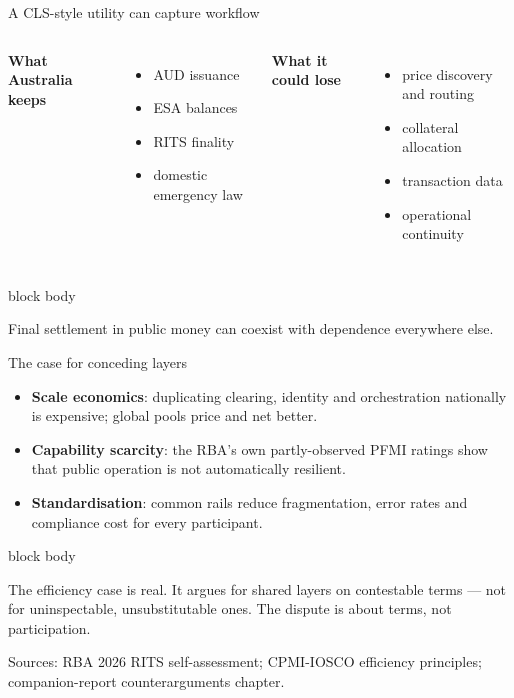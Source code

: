 \documentclass[aspectratio=169,12pt]{beamer}
\newcommand{\rust}[1]{\textcolor{Rust}{\textbf{#1}}}
\newcommand{\blue}[1]{\textcolor{Ocean}{\textbf{#1}}}
\newcommand{\source}[1]{\vfill\par\fontsize{5.4}{6.5}\selectfont\color{Quiet}Sources: #1}
\newcommand{\tightitems}{\setlength{\itemsep}{0.42em}\setlength{\parskip}{0pt}}
\newenvironment{statement}{%
  \begin{beamercolorbox}[sep=.18cm,rounded=false,wd=\linewidth]{block body}%
  \fontsize{13}{15.5}\selectfont\bfseries
}{\end{beamercolorbox}}
\begin{document}
\begin{frame}{A CLS-style utility can capture workflow}
  \begin{columns}[T,onlytextwidth]
      \rust{What Australia keeps}
      \begin{itemize}\tightitems
        \item AUD issuance
        \item ESA balances
        \item RITS finality
        \item domestic emergency law
      \end{itemize}
      \blue{What it could lose}
      \begin{itemize}\tightitems
        \item price discovery and routing
        \item collateral allocation
        \item transaction data
        \item operational continuity
      \end{itemize}
  \end{columns}
  \begin{statement}
    Final settlement in public money can coexist with dependence everywhere else.
  \end{statement}
\end{frame}

\begin{frame}{The case for conceding layers}
  \begin{itemize}\tightitems
    \item \rust{Scale economics}: duplicating clearing, identity and orchestration nationally is expensive; global pools price and net better.
    \item \rust{Capability scarcity}: the RBA's own partly-observed PFMI ratings show that public operation is not automatically resilient.
    \item \rust{Standardisation}: common rails reduce fragmentation, error rates and compliance cost for every participant.
  \end{itemize}
  \vspace{0.26cm}
  \begin{statement}
    The efficiency case is real. It argues for shared layers on contestable terms --- not for uninspectable, unsubstitutable ones. The dispute is about terms, not participation.
  \end{statement}
  \source{RBA 2026 RITS self-assessment; CPMI-IOSCO efficiency principles; companion-report counterarguments chapter.}
\end{frame}
\end{document}
